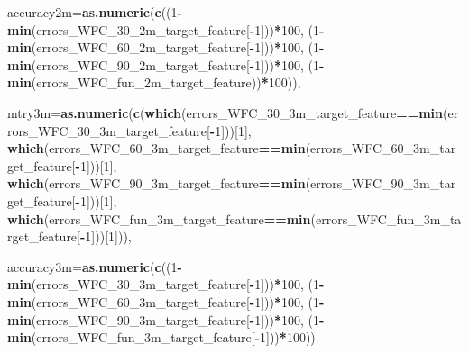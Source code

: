 \documentclass[]{article}
\newenvironment{Shaded}{\begin{snugshade}}{\end{snugshade}}
\newcommand{\KeywordTok}[1]{\textcolor[rgb]{0.13,0.29,0.53}{\textbf{#1}}}
\newcommand{\DataTypeTok}[1]{\textcolor[rgb]{0.13,0.29,0.53}{#1}}
\newcommand{\DecValTok}[1]{\textcolor[rgb]{0.00,0.00,0.81}{#1}}
\newcommand{\OperatorTok}[1]{\textcolor[rgb]{0.81,0.36,0.00}{\textbf{#1}}}
\newcommand{\NormalTok}[1]{#1}
\begin{document}
\begin{Shaded}
\begin{Highlighting}[]
                 \DataTypeTok{accuracy2m=}\KeywordTok{as.numeric}\NormalTok{(}\KeywordTok{c}\NormalTok{((}\DecValTok{1}\OperatorTok{-}\KeywordTok{min}\NormalTok{(errors_WFC_30_2m_target_feature[}\OperatorTok{-}\DecValTok{1}\NormalTok{]))}\OperatorTok{*}\DecValTok{100}\NormalTok{,}
\NormalTok{                                    (}\DecValTok{1}\OperatorTok{-}\KeywordTok{min}\NormalTok{(errors_WFC_60_2m_target_feature[}\OperatorTok{-}\DecValTok{1}\NormalTok{]))}\OperatorTok{*}\DecValTok{100}\NormalTok{,}
\NormalTok{                                    (}\DecValTok{1}\OperatorTok{-}\KeywordTok{min}\NormalTok{(errors_WFC_90_2m_target_feature[}\OperatorTok{-}\DecValTok{1}\NormalTok{]))}\OperatorTok{*}\DecValTok{100}\NormalTok{,}
\NormalTok{                                    (}\DecValTok{1}\OperatorTok{-}\KeywordTok{min}\NormalTok{(errors_WFC_fun_2m_target_feature))}\OperatorTok{*}\DecValTok{100}\NormalTok{)),}
              
              
              \DataTypeTok{mtry3m=}\KeywordTok{as.numeric}\NormalTok{(}\KeywordTok{c}\NormalTok{(}\KeywordTok{which}\NormalTok{(errors_WFC_30_3m_target_feature}\OperatorTok{==}\KeywordTok{min}\NormalTok{(errors_WFC_30_3m_target_feature[}\OperatorTok{-}\DecValTok{1}\NormalTok{]))[}\DecValTok{1}\NormalTok{],}
                                    \KeywordTok{which}\NormalTok{(errors_WFC_60_3m_target_feature}\OperatorTok{==}\KeywordTok{min}\NormalTok{(errors_WFC_60_3m_target_feature[}\OperatorTok{-}\DecValTok{1}\NormalTok{]))[}\DecValTok{1}\NormalTok{],}
                                   \KeywordTok{which}\NormalTok{(errors_WFC_90_3m_target_feature}\OperatorTok{==}\KeywordTok{min}\NormalTok{(errors_WFC_90_3m_target_feature[}\OperatorTok{-}\DecValTok{1}\NormalTok{]))[}\DecValTok{1}\NormalTok{],}
                                   \KeywordTok{which}\NormalTok{(errors_WFC_fun_3m_target_feature}\OperatorTok{==}\KeywordTok{min}\NormalTok{(errors_WFC_fun_3m_target_feature[}\OperatorTok{-}\DecValTok{1}\NormalTok{]))[}\DecValTok{1}\NormalTok{])),}
              
              \DataTypeTok{accuracy3m=}\KeywordTok{as.numeric}\NormalTok{(}\KeywordTok{c}\NormalTok{((}\DecValTok{1}\OperatorTok{-}\KeywordTok{min}\NormalTok{(errors_WFC_30_3m_target_feature[}\OperatorTok{-}\DecValTok{1}\NormalTok{]))}\OperatorTok{*}\DecValTok{100}\NormalTok{,}
\NormalTok{                                    (}\DecValTok{1}\OperatorTok{-}\KeywordTok{min}\NormalTok{(errors_WFC_60_3m_target_feature[}\OperatorTok{-}\DecValTok{1}\NormalTok{]))}\OperatorTok{*}\DecValTok{100}\NormalTok{,}
\NormalTok{                                    (}\DecValTok{1}\OperatorTok{-}\KeywordTok{min}\NormalTok{(errors_WFC_90_3m_target_feature[}\OperatorTok{-}\DecValTok{1}\NormalTok{]))}\OperatorTok{*}\DecValTok{100}\NormalTok{,}
\NormalTok{                                    (}\DecValTok{1}\OperatorTok{-}\KeywordTok{min}\NormalTok{(errors_WFC_fun_3m_target_feature[}\OperatorTok{-}\DecValTok{1}\NormalTok{]))}\OperatorTok{*}\DecValTok{100}\NormalTok{))}
              

\end{Highlighting}
\end{Shaded}
\end{document}
